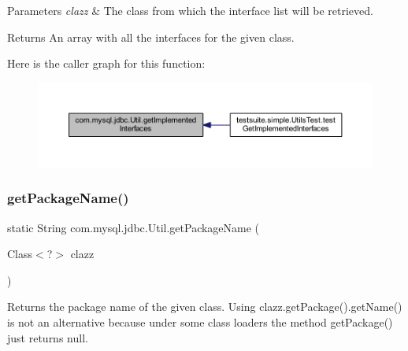 \begin{DoxyParams}{Parameters}
{\em clazz} & The class from which the interface list will be retrieved. \\
\hline
\end{DoxyParams}
\begin{DoxyReturn}{Returns}
An array with all the interfaces for the given class. 
\end{DoxyReturn}
Here is the caller graph for this function\+:
\nopagebreak
\begin{figure}[H]
\begin{center}
\leavevmode
\includegraphics[width=350pt]{classcom_1_1mysql_1_1jdbc_1_1_util_a35e35548da42c684a68e73f8ccfc2fdb_icgraph}
\end{center}
\end{figure}
\mbox{\label{classcom_1_1mysql_1_1jdbc_1_1_util_a30a2020999202ce3bb0871498f6bcc5b}} 
\subsubsection{\texorpdfstring{get\+Package\+Name()}{getPackageName()}}
{\footnotesize\ttfamily static String com.\+mysql.\+jdbc.\+Util.\+get\+Package\+Name (\begin{DoxyParamCaption}\item[{Class$<$?$>$}]{clazz }\end{DoxyParamCaption})\hspace{0.3cm}{\ttfamily [static]}}

Returns the package name of the given class. Using clazz.\+get\+Package().get\+Name() is not an alternative because under some class loaders the method get\+Package() just returns null.


